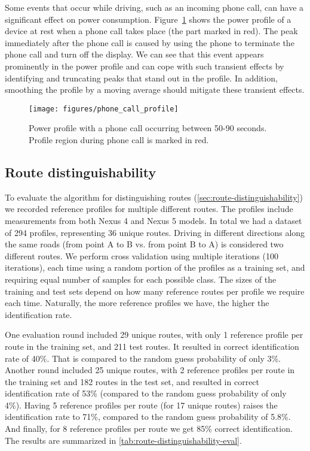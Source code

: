 Some events that occur while driving, such as an incoming phone call,
can have a significant effect on power consumption.
Figure~\ref{fig:phone-call} shows the power profile of a device at
rest when a phone call takes place (the part marked in red).  The peak
immediately after the phone call is caused by using the phone to
terminate the phone call and turn off the display.  We can see that
this event appears prominently in the power profile and can cope with
such transient effects by identifying and truncating peaks that stand
out in the profile.  In addition, smoothing the profile by a moving
average should mitigate these transient effects.

\begin{figure}
    \centering
    \texttt{[image: figures/phone\_call\_profile]}
    \caption{Power profile with a phone call occurring between 50-90 seconds.
        Profile region during phone call is marked in red.}
    \label{fig:phone-call}
\end{figure}
 
\subsection{Route distinguishability}
To evaluate the algorithm for distinguishing routes (\cref{sec:route-distinguishability})
we recorded reference profiles for multiple different routes.
The profiles include measurements from both Nexus 4 and Nexus 5 models.
In total we had a dataset of 294 profiles, representing 36 unique routes.
Driving in different directions along the same roads (from point A to B vs. from point B to A)
is considered two different routes.
We perform cross validation using multiple iterations (100 iterations),
each time using a random portion of the profiles as a training set, and requiring
equal number of samples for each possible class.
The sizes of the training and test sets depend on how many reference routes per profile we require
each time. Naturally, the more reference profiles we have, the higher the identification rate.

One evaluation round included 29 unique routes, with only 1 reference profile per route in the training
set, and 211 test routes. It resulted in correct identification rate of 40\%.
That is compared to the random guess probability of only 3\%.
Another round included 25 unique routes, with 2 reference profiles per route in the training set
and 182 routes in the test set, and resulted in correct identification rate of 53\%
(compared to the random guess probability of only 4\%).
Having 5 reference profiles per route (for 17 unique routes) raises the identification rate to 71\%,
compared to the random guess probability of 5.8\%. And finally, for 8 reference profiles per route we get
85\% correct identification.
The results are summarized in \cref{tab:route-distinguishability-eval}.

